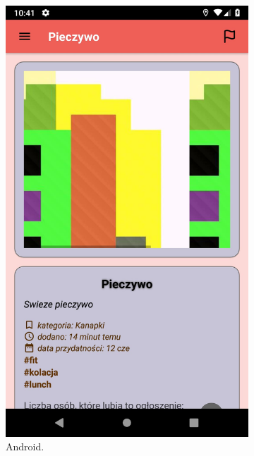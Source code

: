 \documentclass[licencjacka]{pracamgr}
\begin{document}
\newpage
\begin{figure}[h!]
  \centering
  \begin{subfigure}[b]{0.4\linewidth}
    \begin{framed}
      \includegraphics[width=\linewidth]{android2.jpg}
    \end{framed}
    \caption{Android.}
  \end{subfigure}
  \begin{subfigure}[b]{0.4\linewidth}
    \begin{framed}

\end{framed}
\end{subfigure}
\end{figure}
\end{document}
